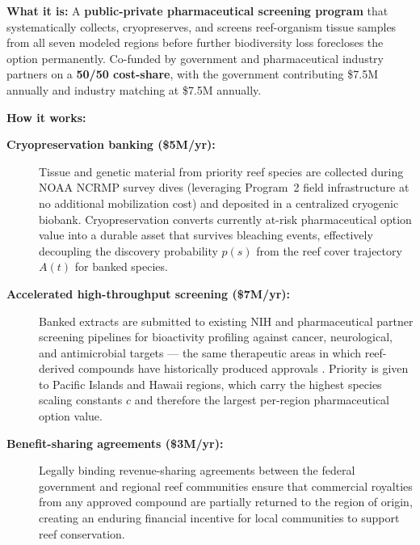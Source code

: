 \documentclass[10pt,letterpaper]{article}
\begin{document}
\begin{tcolorbox}[title=Program 6: Pharmaceutical Biodiversity Prospecting Fund --- \$15M Annual Total,
  colback=teal!5, colframe=teal!60!black, fonttitle=\bfseries, breakable]

  \textbf{What it is:} A \textbf{public-private pharmaceutical screening program} that systematically collects, cryopreserves, and screens reef-organism tissue samples from all seven modeled regions before further biodiversity loss forecloses the option permanently. Co-funded by government and pharmaceutical industry partners on a \textbf{50/50 cost-share}, with the government contributing \$7.5M annually and industry matching at \$7.5M annually.

  \medskip
  \textbf{How it works:}
  \begin{description}
    \item[\textbf{Cryopreservation banking (\$5M/yr):}] Tissue and genetic material from priority reef species are collected during NOAA NCRMP survey dives (leveraging Program~2 field infrastructure at no additional mobilization cost) and deposited in a centralized cryogenic biobank. Cryopreservation converts currently at-risk pharmaceutical option value into a durable asset that survives bleaching events, effectively decoupling the discovery probability $p(s)$ from the reef cover trajectory $A(t)$ for banked species.
    \item[\textbf{Accelerated high-throughput screening (\$7M/yr):}] Banked extracts are submitted to existing NIH and pharmaceutical partner screening pipelines for bioactivity profiling against cancer, neurological, and antimicrobial targets --- the same therapeutic areas in which reef-derived compounds have historically produced approvals \cite{newman2016}. Priority is given to Pacific Islands and Hawaii regions, which carry the highest species scaling constants $c$ and therefore the largest per-region pharmaceutical option value.
    \item[\textbf{Benefit-sharing agreements (\$3M/yr):}] Legally binding revenue-sharing agreements between the federal government and regional reef communities ensure that commercial royalties from any approved compound are partially returned to the region of origin, creating an enduring financial incentive for local communities to support reef conservation.
  \end{description}


\end{tcolorbox}
\end{document}
